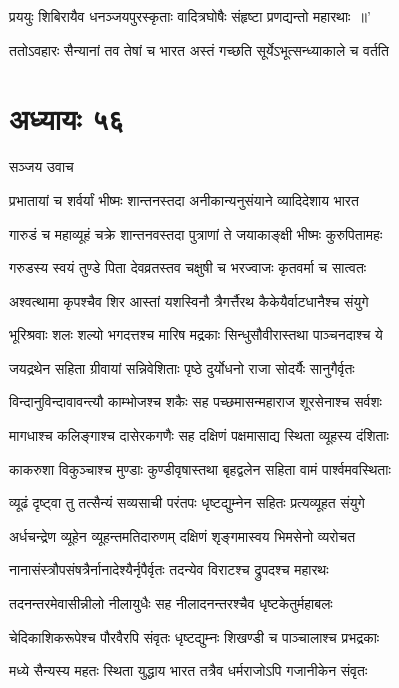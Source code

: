 \twolineshloka
{प्रययुः शिबिरायैव धनञ्जयपुरस्कृताः}
{वादित्रघोषैः संहृष्टा प्रणद्यन्तो महारथाः ॥'}


\twolineshloka
{ततोऽवहारः सैन्यानां तव तेषां च भारत}
{अस्तं गच्छति सूर्येऽभूत्सन्ध्याकाले च वर्तति}


\chapter{अध्यायः ५६}
\twolineshloka
{सञ्जय उवाच}
{}


\twolineshloka
{प्रभातायां च शर्वर्यां भीष्मः शान्तनस्तदा}
{अनीकान्यनुसंयाने व्यादिदेशाय भारत}


\threelineshloka
{गारुडं च महाव्यूहं चक्रे शान्तनवस्तदा}
{पुत्राणां ते जयाकाङ्क्षी भीष्मः कुरुपितामहः}
{}


\twolineshloka
{गरुडस्य स्वयं तुण्डे पिता देवव्रतस्तव}
{चक्षुषी च भरज्वाजः कृतवर्मा च सात्वतः}


\twolineshloka
{अश्वत्थामा कृपश्चैव शिर आस्तां यशस्विनौ}
{त्रैगर्त्तैरथ कैकेयैर्वाटधानैश्च संयुगे}


\twolineshloka
{भूरिश्रवाः शलः शल्यो भगदत्तश्च मारिष}
{मद्रकाः सिन्धुसौवीरास्तथा पाञ्चनदाश्च ये}


\twolineshloka
{जयद्रथेन सहिता ग्रीवायां सन्निवेशिताः}
{पृष्ठे दुर्योधनो राजा सोदर्यैः सानुगैर्वृतः}


\twolineshloka
{विन्दानुविन्दावावन्त्यौ काम्भोजश्च शकैः सह}
{पच्छमासन्महाराज शूरसेनाश्च सर्वशः}


\twolineshloka
{मागधाश्च कलिङ्गाश्च दासेरकगणैः सह}
{दक्षिणं पक्षमासाद्य स्थिता व्यूहस्य दंशिताः}


\twolineshloka
{काकरुशा विकुञ्चाश्च मुण्डाः कुण्डीवृषास्तथा}
{बृहद्वलेन सहिता वामं पार्श्वमवस्थिताः}


\twolineshloka
{व्यूढं दृष्ट्वा तु तत्सैन्यं सव्यसाची परंतपः}
{धृष्टद्युम्नेन सहितः प्रत्यव्यूहत संयुगे}


\twolineshloka
{अर्धचन्द्रेण व्यूहेन व्यूहन्तमतिदारुणम्}
{दक्षिणं शृङ्गमास्वय भिमसेनो व्यरोचत}


\twolineshloka
{नानासंस्त्रौपसंषत्रैर्नानादेश्यैर्नृपैर्वृतः}
{तदन्येव विराटश्च द्रुपदश्च महारथः}


\twolineshloka
{तदनन्तरमेवासीन्नीलो नीलायुधैः सह}
{नीलादनन्तरश्चैव धृष्टकेतुर्महाबलः}


\twolineshloka
{चेदिकाशिकरूपेश्च पौरवैरपि संवृतः}
{धृष्टद्युम्नः शिखण्डी च पाञ्चालाश्च प्रभद्रकाः}


\threelineshloka
{मध्ये सैन्यस्य महतः स्थिता युद्धाय भारत}
{तत्रैव धर्मराजोऽपि गजानीकेन संवृतः}
{}


